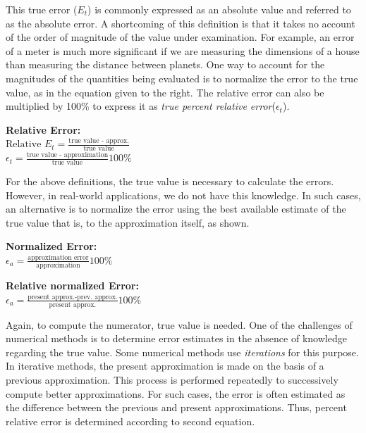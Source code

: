 \documentclass[book.tex]{subfiles}
\begin{document}
This true error ($E_t$) is commonly expressed as an absolute value and referred to as the absolute error. A shortcoming of this definition is that it takes no account of the order of magnitude of the value under examination. For example, an error of a meter is much more significant if we are measuring the dimensions of a house than measuring the distance between planets. One way to account for the magnitudes of the quantities being evaluated is to normalize the error to the true value, as in the equation given to the right. The relative error can also be multiplied by 100\% to express it as \textit{true percent relative error}($\epsilon_t$).

\begin{margintable}
\textbf{Relative Error:}\\

	$ \text{Relative } E_t = \frac{\text{true value - approx.}}{\text{true value}}$\\
	
    $ \epsilon_t = \frac{\text{true value - approximation}}{\text{true value}} 100\% $
\end{margintable}

For the above definitions, the true value is necessary to calculate the errors. However, in real-world applications, we do not have this knowledge. In such cases, an alternative is to normalize the error using the best available estimate of the true value that is, to the approximation itself, as shown.
\begin{margintable}
\textbf{Normalized Error:}\\

$ \epsilon_a=\frac{\text{approximation error}}{\text{approximation}} 100\% $
\end{margintable}
\begin{margintable}
\textbf{Relative normalized Error:}\\

$\epsilon_a=\frac{\text{present approx.-prev. approx.}}{\text{present approx.}} 100\%$
\end{margintable}

Again, to compute the numerator, true value is needed. One of the challenges of numerical methods is to determine error estimates in the absence of knowledge regarding the true value. Some numerical methods use \textit{iterations} for this purpose. In iterative methods, the present approximation is made on the basis of a previous approximation. This process is performed repeatedly to successively compute better approximations. For such cases, the error is often estimated as the difference between the previous and present approximations. Thus, percent relative error is determined according to second equation.
\end{document}
